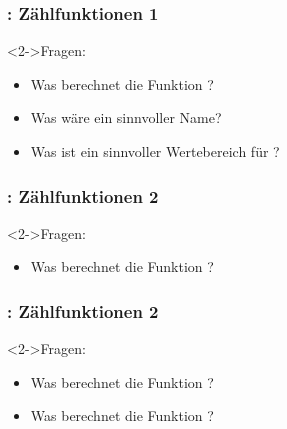 \begin{fframe}
    \frametitle{\currentfsheading : Zählfunktionen 1}
    \begin{block}<2->{Fragen:}
        \begin{itemize}
            \item Was berechnet die Funktion ?
            \item Was wäre ein sinnvoller Name?
            \item Was ist ein sinnvoller Wertebereich für ?
        \end{itemize}
    \end{block}
\end{fframe}

\begin{fframe}
    \frametitle{\currentfsheading : Zählfunktionen 2}
    \begin{block}<2->{Fragen:}
        \begin{itemize}
            \item Was berechnet die Funktion ?
        \end{itemize}
    \end{block}
\end{fframe}

\begin{fframe}
    \frametitle{\currentfsheading : Zählfunktionen 2}
    \begin{block}<2->{Fragen:}
        \begin{itemize}
            \item Was berechnet die Funktion ?
            \item Was berechnet die Funktion ?
        \end{itemize}
    \end{block}
\end{fframe}
